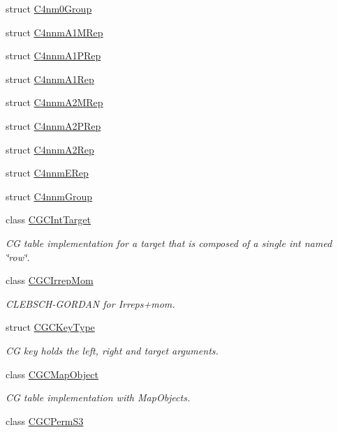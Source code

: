 \begin{DoxyCompactItemize}
\item 
struct \mbox{\hyperlink{structHadron_1_1C4nm0Group}{C4nm0\+Group}}
\item 
struct \mbox{\hyperlink{structHadron_1_1C4nnmA1MRep}{C4nnm\+A1\+M\+Rep}}
\item 
struct \mbox{\hyperlink{structHadron_1_1C4nnmA1PRep}{C4nnm\+A1\+P\+Rep}}
\item 
struct \mbox{\hyperlink{structHadron_1_1C4nnmA1Rep}{C4nnm\+A1\+Rep}}
\item 
struct \mbox{\hyperlink{structHadron_1_1C4nnmA2MRep}{C4nnm\+A2\+M\+Rep}}
\item 
struct \mbox{\hyperlink{structHadron_1_1C4nnmA2PRep}{C4nnm\+A2\+P\+Rep}}
\item 
struct \mbox{\hyperlink{structHadron_1_1C4nnmA2Rep}{C4nnm\+A2\+Rep}}
\item 
struct \mbox{\hyperlink{structHadron_1_1C4nnmERep}{C4nnm\+E\+Rep}}
\item 
struct \mbox{\hyperlink{structHadron_1_1C4nnmGroup}{C4nnm\+Group}}
\item 
class \mbox{\hyperlink{classHadron_1_1CGCIntTarget}{C\+G\+C\+Int\+Target}}
\begin{DoxyCompactList}\small\item\em CG table implementation for a target that is composed of a single int named \char`\"{}row\char`\"{}. \end{DoxyCompactList}\item 
class \mbox{\hyperlink{classHadron_1_1CGCIrrepMom}{C\+G\+C\+Irrep\+Mom}}
\begin{DoxyCompactList}\small\item\em C\+L\+E\+B\+S\+C\+H-\/\+G\+O\+R\+D\+AN for Irreps+mom. \end{DoxyCompactList}\item 
struct \mbox{\hyperlink{structHadron_1_1CGCKeyType}{C\+G\+C\+Key\+Type}}
\begin{DoxyCompactList}\small\item\em CG key holds the left, right and target arguments. \end{DoxyCompactList}\item 
class \mbox{\hyperlink{classHadron_1_1CGCMapObject}{C\+G\+C\+Map\+Object}}
\begin{DoxyCompactList}\small\item\em CG table implementation with Map\+Objects. \end{DoxyCompactList}\item 
class \mbox{\hyperlink{classHadron_1_1CGCPermS3}{C\+G\+C\+Perm\+S3}}

\end{DoxyCompactItemize}
